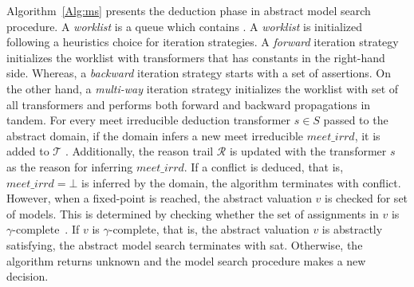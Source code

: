 Algorithm~\ref{Alg:ms} presents the deduction phase in abstract model
search procedure. 
A {\em worklist} is a queue which contains .  A {\em worklist} is initialized following a heuristics 
choice for iteration strategies. A {\em forward} iteration 
strategy initializes the worklist with  transformers that 
has constants in the right-hand side. Whereas, a {\em backward} 
iteration strategy starts with a set of assertions. On the other hand, a 
{\em multi-way} iteration strategy initializes the worklist with set of all 
transformers and performs both forward and backward propagations in tandem.  
For every meet irreducible deduction transformer  $s \in S$ 
passed to the abstract domain, if the domain infers a new meet irreducible 
$\mathit{meet\_irrd}$, it is added to $\mathcal{T}$ .  Additionally, the reason 
trail $\mathcal{R}$  is updated with the transformer $s$ as the reason for inferring
$\mathit{meet\_irrd}$. If a conflict is deduced, that is, $\mathit{meet\_irrd} = \bot$ 
is inferred by the domain, the algorithm terminates with \textsf{conflict}.  However,
when a fixed-point is reached, the abstract valuation $v$ is checked for set of
models.  This is determined by checking whether the set of assignments in $v$ is 
$\gamma$-complete~\cite{dhk2013-popl}. If $v$ is $\gamma$-complete, that is, the 
abstract valuation $v$ is abstractly satisfying, the abstract model 
search terminates with \textsf{sat}.  Otherwise, the algorithm returns \textsf{unknown} and the 
model search procedure makes a new decision.    



